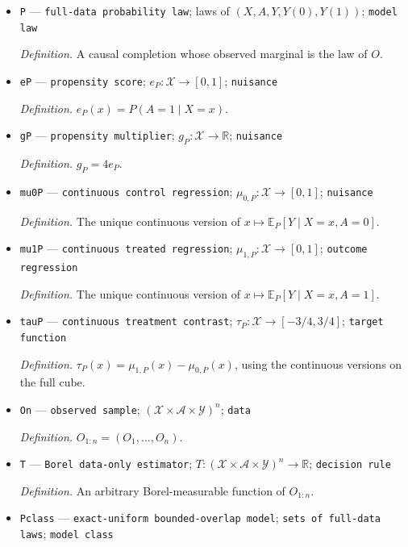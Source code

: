 \documentclass{article}
\begin{document}
\begin{itemize}
  \par\smallskip\noindent\emph{Definition.} \(O=(X,A,Y)\).
  \item \texttt{P} --- \texttt{full-\allowbreak{}data probability law}; laws of \((X,A,Y,Y(0),Y(1))\); \texttt{model law}
  \par\smallskip\noindent\emph{Definition.} A causal completion whose observed marginal is the law of \(O\).
  \item \texttt{eP} --- \texttt{propensity score}; \(e_P:\mathcal X\to[0,1]\); \texttt{nuisance}
  \par\smallskip\noindent\emph{Definition.} \(e_P(x)=P(A=1\mid X=x)\).
  \item \texttt{gP} --- \texttt{propensity multiplier}; \(g_P:\mathcal X\to\mathbb R\); \texttt{nuisance}
  \par\smallskip\noindent\emph{Definition.} \(g_P=4e_P\).
  \item \texttt{mu0P} --- \texttt{continuous control regression}; \(\mu_{0,P}:\mathcal X\to[0,1]\); \texttt{nuisance}
  \par\smallskip\noindent\emph{Definition.} The unique continuous version of \(x\mapsto\mathbb E_P[Y\mid X=x,A=0]\).
  \item \texttt{mu1P} --- \texttt{continuous treated regression}; \(\mu_{1,P}:\mathcal X\to[0,1]\); \texttt{outcome regression}
  \par\smallskip\noindent\emph{Definition.} The unique continuous version of \(x\mapsto\mathbb E_P[Y\mid X=x,A=1]\).
  \item \texttt{tauP} --- \texttt{continuous treatment contrast}; \(\tau_P:\mathcal X\to[-3/4,3/4]\); \texttt{target function}
  \par\smallskip\noindent\emph{Definition.} \(\tau_P(x)=\mu_{1,P}(x)-\mu_{0,P}(x)\), using the continuous versions on the full cube.
  \item \texttt{On} --- \texttt{observed sample}; \((\mathcal X\times\mathcal A\times\mathcal Y)^n\); \texttt{data}
  \par\smallskip\noindent\emph{Definition.} \(O_{1:n}=(O_1,\ldots,O_n)\).
  \item \texttt{T} --- \texttt{Borel data-\allowbreak{}only estimator}; \(T:(\mathcal X\times\mathcal A\times\mathcal Y)^n\to\mathbb R\); \texttt{decision rule}
  \par\smallskip\noindent\emph{Definition.} An arbitrary Borel-measurable function of \(O_{1:n}\).
  \item \texttt{Pclass} --- \texttt{exact-\allowbreak{}uniform bounded-\allowbreak{}overlap model}; \texttt{sets of full-\allowbreak{}data laws}; \texttt{model class}

\end{itemize}
\end{document}
